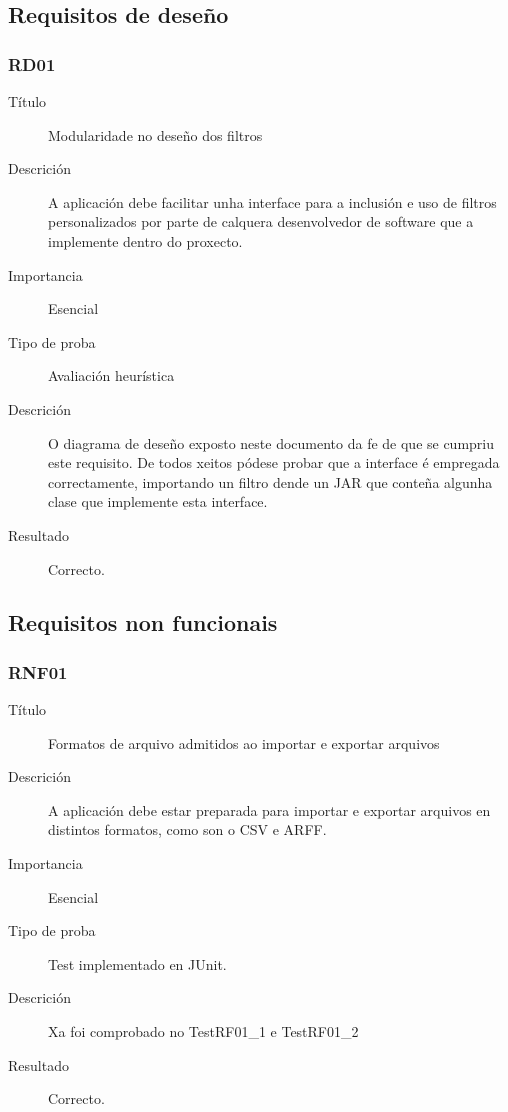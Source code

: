 \subsection{Requisitos de deseño}

\subsubsection*{RD01}
\begin{description}
\item[Título] \hfill
Modularidade no deseño dos filtros
\item[Descrición] \hfill
A aplicación debe facilitar unha interface para a inclusión e uso de filtros personalizados por parte de calquera desenvolvedor de software que a implemente dentro do proxecto.
\item[Importancia] \hfill
Esencial
\item[Tipo de proba] \hfill
Avaliación heurística
\item[Descrición]
O diagrama de deseño exposto neste documento da fe de que se cumpriu este requisito. De todos xeitos pódese probar que a interface é empregada correctamente, importando un filtro dende un JAR que conteña algunha clase que implemente esta interface.
\item[Resultado]
Correcto.
\end{description}

\subsection{Requisitos non funcionais}

\subsubsection*{RNF01}
\begin{description}
\item[Título] \hfill
Formatos de arquivo admitidos ao importar e exportar arquivos
\item[Descrición] \hfill
A aplicación debe estar preparada para importar e exportar arquivos en distintos formatos, como son o CSV e ARFF.
\item[Importancia] \hfill
Esencial
\item[Tipo de proba] \hfill
Test implementado en JUnit.
\item[Descrición]
Xa foi comprobado no TestRF01\_1 e TestRF01\_2
\item[Resultado]
Correcto.
\end{description}


